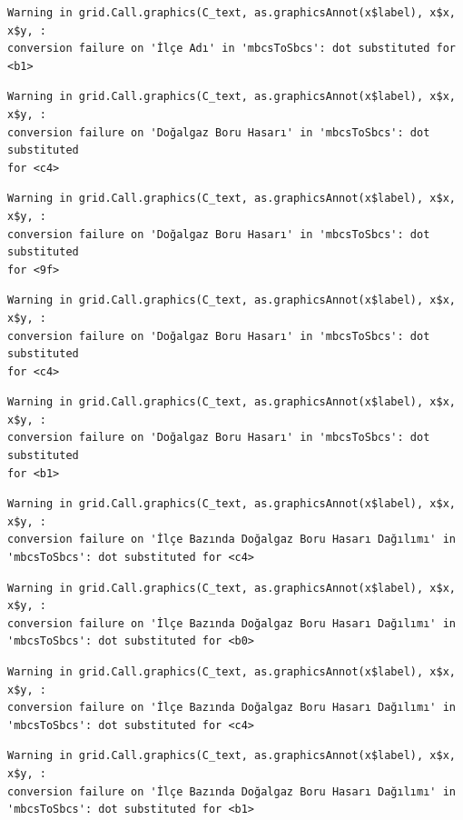 \documentclass[
  11pt,
  a4paper,
  DIV=11,
  numbers=noendperiod]{scrartcl}
\begin{document}
\begin{verbatim}
Warning in grid.Call.graphics(C_text, as.graphicsAnnot(x$label), x$x, x$y, :
conversion failure on 'İlçe Adı' in 'mbcsToSbcs': dot substituted for <b1>
\end{verbatim}

\begin{verbatim}
Warning in grid.Call.graphics(C_text, as.graphicsAnnot(x$label), x$x, x$y, :
conversion failure on 'Doğalgaz Boru Hasarı' in 'mbcsToSbcs': dot substituted
for <c4>
\end{verbatim}

\begin{verbatim}
Warning in grid.Call.graphics(C_text, as.graphicsAnnot(x$label), x$x, x$y, :
conversion failure on 'Doğalgaz Boru Hasarı' in 'mbcsToSbcs': dot substituted
for <9f>
\end{verbatim}

\begin{verbatim}
Warning in grid.Call.graphics(C_text, as.graphicsAnnot(x$label), x$x, x$y, :
conversion failure on 'Doğalgaz Boru Hasarı' in 'mbcsToSbcs': dot substituted
for <c4>
\end{verbatim}

\begin{verbatim}
Warning in grid.Call.graphics(C_text, as.graphicsAnnot(x$label), x$x, x$y, :
conversion failure on 'Doğalgaz Boru Hasarı' in 'mbcsToSbcs': dot substituted
for <b1>
\end{verbatim}

\begin{verbatim}
Warning in grid.Call.graphics(C_text, as.graphicsAnnot(x$label), x$x, x$y, :
conversion failure on 'İlçe Bazında Doğalgaz Boru Hasarı Dağılımı' in
'mbcsToSbcs': dot substituted for <c4>
\end{verbatim}

\begin{verbatim}
Warning in grid.Call.graphics(C_text, as.graphicsAnnot(x$label), x$x, x$y, :
conversion failure on 'İlçe Bazında Doğalgaz Boru Hasarı Dağılımı' in
'mbcsToSbcs': dot substituted for <b0>
\end{verbatim}

\begin{verbatim}
Warning in grid.Call.graphics(C_text, as.graphicsAnnot(x$label), x$x, x$y, :
conversion failure on 'İlçe Bazında Doğalgaz Boru Hasarı Dağılımı' in
'mbcsToSbcs': dot substituted for <c4>
\end{verbatim}

\begin{verbatim}
Warning in grid.Call.graphics(C_text, as.graphicsAnnot(x$label), x$x, x$y, :
conversion failure on 'İlçe Bazında Doğalgaz Boru Hasarı Dağılımı' in
'mbcsToSbcs': dot substituted for <b1>
\end{verbatim}
\end{document}

